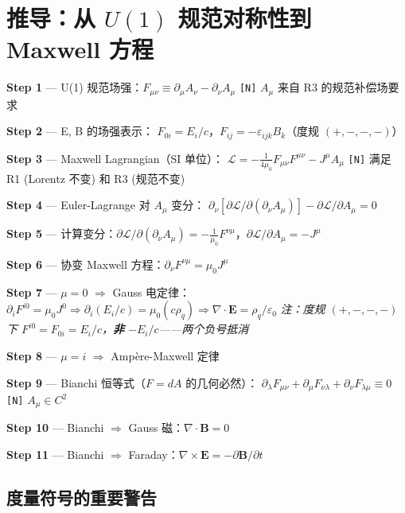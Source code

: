 \section{推导：从 $U(1)$ 规范对称性到 Maxwell 方程}

\begin{derivationbox}[G4 基础 — 规范场框架]
  \textbf{Step 1} — U(1) 规范场强：$F_{\mu\nu} \equiv \partial_\mu A_\nu - \partial_\nu A_\mu$
  \hfill\texttt{[N]} $A_\mu$ 来自 R3 的规范补偿场要求

  \textbf{Step 2} — E, B 的场强表示：
  $F_{0i} = E_i/c$，$F_{ij} = -\varepsilon_{ijk}B_k$（度规 $(+,-,-,-)$）

  \textbf{Step 3} — Maxwell Lagrangian（SI 单位）：
  $\mathcal{L} = -\frac{1}{4\mu_0}F_{\mu\nu}F^{\mu\nu} - J^\mu A_\mu$
  \hfill\texttt{[N]} 满足 R1 (Lorentz 不变) 和 R3 (规范不变)

  \textbf{Step 4} — Euler-Lagrange 对 $A_\mu$ 变分：
  $\partial_\nu[\partial\mathcal{L}/\partial(\partial_\nu A_\mu)] - \partial\mathcal{L}/\partial A_\mu = 0$

  \textbf{Step 5} — 计算变分：$\partial\mathcal{L}/\partial(\partial_\nu A_\mu) = -\frac{1}{\mu_0}F^{\nu\mu}$，$\partial\mathcal{L}/\partial A_\mu = -J^\mu$

  \textbf{Step 6} — 协变 Maxwell 方程：$\partial_\nu F^{\nu\mu} = \mu_0 J^\mu$

  \textbf{Step 7} — $\mu=0$ $\Rightarrow$ Gauss 电定律：
  $\partial_i F^{i0} = \mu_0 J^0 \Rightarrow \partial_i(E_i/c) = \mu_0(c\rho_q) \Rightarrow \nabla\cdot\mathbf{E} = \rho_q/\varepsilon_0$
  \hfill\textit{注：度规 $(+,-,-,-)$ 下 $F^{i0} = F_{0i} = E_i/c$，\textbf{非} $-E_i/c$——两个负号抵消}

  \textbf{Step 8} — $\mu=i$ $\Rightarrow$ Amp\`{e}re-Maxwell 定律

  \textbf{Step 9} — Bianchi 恒等式（$F = dA$ 的几何必然）：
  $\partial_\lambda F_{\mu\nu} + \partial_\mu F_{\nu\lambda} + \partial_\nu F_{\lambda\mu} \equiv 0$
  \hfill\texttt{[N]} $A_\mu \in C^2$

  \textbf{Step 10} — Bianchi $\Rightarrow$ Gauss 磁：$\nabla\cdot\mathbf{B} = 0$

  \textbf{Step 11} — Bianchi $\Rightarrow$ Faraday：$\nabla\times\mathbf{E} = -\partial\mathbf{B}/\partial t$
\end{derivationbox}

\subsection{度量符号的重要警告}

